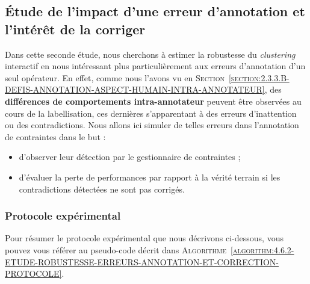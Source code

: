 	\subsection{Étude de l'impact d'une erreur d'annotation et l'intérêt de la corriger}
	\label{section:4.6.2-ETUDE-ROBUSTESSE-ERREURS-ANNOTATION-ET-CORRECTION}
		
		Dans cette seconde étude, nous cherchons à estimer la robustesse du \textit{clustering} interactif en nous intéressant plus particulièrement aux erreurs d'annotation d'un seul opérateur.
		En effet, comme nous l'avons vu en \textsc{Section~\ref{section:2.3.3.B-DEFIS-ANNOTATION-ASPECT-HUMAIN-INTRA-ANNOTATEUR}}, des \textbf{différences de comportements intra-annotateur} peuvent être observées au cours de la labellisation, ces dernières s'apparentant à des erreurs d'inattention ou des contradictions.
		Nous allons ici simuler de telles erreurs dans l'annotation de contraintes dans le but :
		\begin{itemize}
			\item d'observer leur détection par le gestionnaire de contraintes ;
			\item d'évaluer la perte de performances par rapport à la vérité terrain si les contradictions détectées ne sont pas corrigés.
		\end{itemize}
	
		\subsubsection{Protocole expérimental}
			
			Pour résumer le protocole expérimental que nous décrivons ci-dessous, vous pouvez vous référer au pseudo-code décrit dans \textsc{Algorithme~\ref{algorithm:4.6.2-ETUDE-ROBUSTESSE-ERREURS-ANNOTATION-ET-CORRECTION-PROTOCOLE}}.
			
